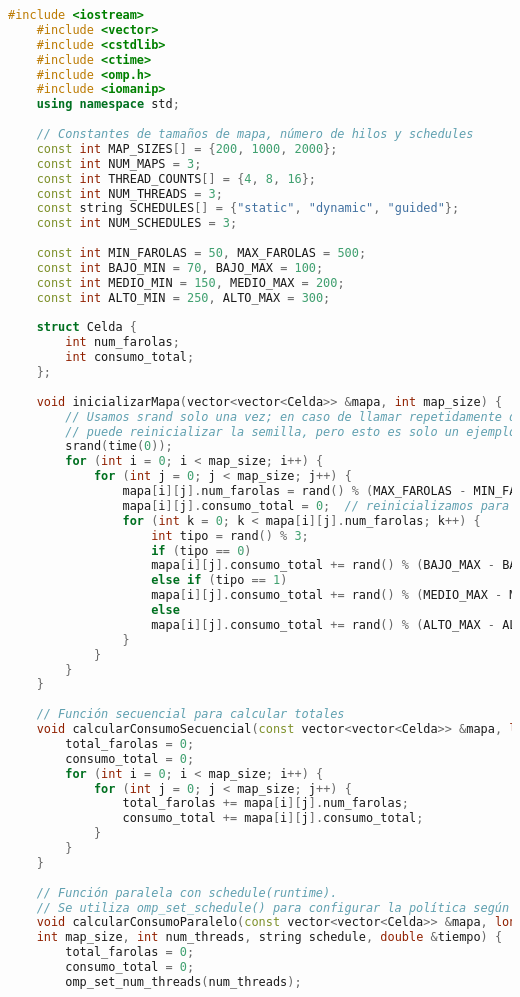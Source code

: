 \documentclass{article}
\begin{document}
	\begin{lstlisting}[language=C++, style=cpp-style, caption={Ejemplo de código en C++.}]
	#include <iostream>
	#include <vector>
	#include <cstdlib>
	#include <ctime>
	#include <omp.h>
	#include <iomanip>
	using namespace std;
	
	// Constantes de tamaños de mapa, número de hilos y schedules
	const int MAP_SIZES[] = {200, 1000, 2000};
	const int NUM_MAPS = 3;
	const int THREAD_COUNTS[] = {4, 8, 16};
	const int NUM_THREADS = 3;
	const string SCHEDULES[] = {"static", "dynamic", "guided"};
	const int NUM_SCHEDULES = 3;
	
	const int MIN_FAROLAS = 50, MAX_FAROLAS = 500;
	const int BAJO_MIN = 70, BAJO_MAX = 100;
	const int MEDIO_MIN = 150, MEDIO_MAX = 200;
	const int ALTO_MIN = 250, ALTO_MAX = 300;
	
	struct Celda {
		int num_farolas;
		int consumo_total;
	};
	
	void inicializarMapa(vector<vector<Celda>> &mapa, int map_size) {
		// Usamos srand solo una vez; en caso de llamar repetidamente dentro del bucle
		// puede reinicializar la semilla, pero esto es solo un ejemplo.
		srand(time(0));
		for (int i = 0; i < map_size; i++) {
			for (int j = 0; j < map_size; j++) {
				mapa[i][j].num_farolas = rand() % (MAX_FAROLAS - MIN_FAROLAS + 1) + MIN_FAROLAS;
				mapa[i][j].consumo_total = 0;  // reinicializamos para cada celda
				for (int k = 0; k < mapa[i][j].num_farolas; k++) {
					int tipo = rand() % 3;
					if (tipo == 0)
					mapa[i][j].consumo_total += rand() % (BAJO_MAX - BAJO_MIN + 1) + BAJO_MIN;
					else if (tipo == 1)
					mapa[i][j].consumo_total += rand() % (MEDIO_MAX - MEDIO_MIN + 1) + MEDIO_MIN;
					else
					mapa[i][j].consumo_total += rand() % (ALTO_MAX - ALTO_MIN + 1) + ALTO_MIN;
				}
			}
		}
	}
	
	// Función secuencial para calcular totales
	void calcularConsumoSecuencial(const vector<vector<Celda>> &mapa, long long &total_farolas, long long &consumo_total, int map_size) {
		total_farolas = 0;
		consumo_total = 0;
		for (int i = 0; i < map_size; i++) {
			for (int j = 0; j < map_size; j++) {
				total_farolas += mapa[i][j].num_farolas;
				consumo_total += mapa[i][j].consumo_total;
			}
		}
	}
	
	// Función paralela con schedule(runtime).
	// Se utiliza omp_set_schedule() para configurar la política según la cadena recibida.
	void calcularConsumoParalelo(const vector<vector<Celda>> &mapa, long long &total_farolas, long long &consumo_total,
	int map_size, int num_threads, string schedule, double &tiempo) {
		total_farolas = 0;
		consumo_total = 0;
		omp_set_num_threads(num_threads);
		

\end{lstlisting}
\end{document}
